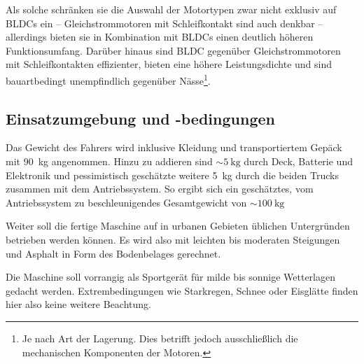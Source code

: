 			Als solche schränken sie die Auswahl der Motortypen zwar nicht exklusiv auf BLDCs ein -- Gleichstrommotoren mit Schleifkontakt sind auch denkbar -- allerdings bieten sie in Kombination mit BLDCs einen deutlich höheren Funktionsumfang.
			Darüber hinaus sind BLDC gegenüber Gleichstrommotoren mit Schleifkontakten effizienter, bieten eine höhere Leistungsdichte und sind bauartbedingt unempfindlich gegenüber Nässe\footnote{Je nach Art der Lagerung. Dies betrifft jedoch ausschließlich die mechanischen Komponenten der Motoren.}.
		\subsection{Einsatzumgebung und -bedingungen}
			Das Gewicht des Fahrers wird inklusive Kleidung und transportiertem Gepäck mit \qty{90}{\kilo\gram} angenommen.
			Hinzu zu addieren sind \(\sim \qty{5}{\kilo\gram}\) durch Deck, Batterie und Elektronik und pessimistisch geschätzte weitere \qty{5}{\kilo\gram} durch die beiden Trucks zusammen mit dem Antriebssystem.
			So ergibt sich ein geschätztes, vom Antriebssystem zu beschleunigendes Gesamtgewicht von \(\sim \qty{100}{\kilo\gram}\)\par
			Weiter soll die fertige Maschine auf in urbanen Gebieten üblichen Untergründen betrieben werden können.
			Es wird also mit leichten bis moderaten Steigungen und Asphalt in Form des Bodenbelages gerechnet.\par\medskip
			Die Maschine soll vorrangig als Sportgerät für milde bis sonnige Wetterlagen gedacht werden.
			Extrembedingungen wie Starkregen, Schnee oder Eisglätte finden hier also keine weitere Beachtung.

